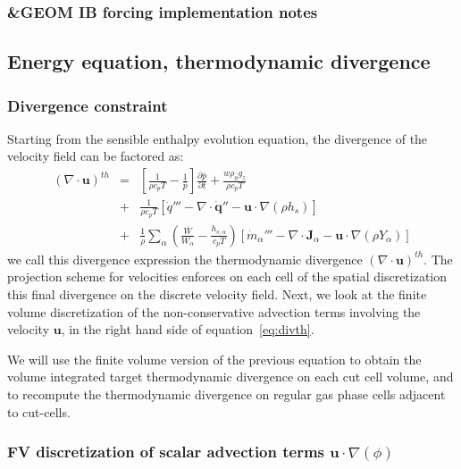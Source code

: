 \documentclass[12pt]{article}
\begin{document}
\subsubsection{\&GEOM IB forcing implementation notes}


\subsection{Energy equation, thermodynamic divergence}

\subsubsection{Divergence constraint}

Starting from the sensible enthalpy evolution equation, the divergence of the velocity field can be factored as:
%
\begin{eqnarray}
    ( \nabla \cdot \mathbf{u} )^{th} &=&
    \left[ \frac{1}{\rho c_p T} - \frac{1}{\bar{p}} \right]
    \frac{\partial \bar{p}}{\partial t} + \frac{w \rho_0 g_z}{\rho c_p T} \nonumber \\
    &+& \frac{1}{\rho c_p T} \left[ \dot{q}''' - \nabla \cdot \dot{\mathbf{q}}'' - \mathbf{u} \cdot \nabla (\rho h_s) \right] \nonumber \\
    &+& \frac{1}{\rho} \sum_\alpha \left( \frac{\overline{W}}{W_\alpha} - \frac{h_{s,\alpha}}{c_p T} \right) \left[ \dot{m}_\alpha''' - \nabla \cdot \mathbf{J}_\alpha - \mathbf{u} \cdot \nabla (\rho Y_\alpha) \right] \label{eq:divth}
\end{eqnarray}
%
we call this divergence expression the thermodynamic divergence $( \nabla \cdot \mathbf{u} )^{th}$. The projection scheme for velocities enforces on each cell of the spatial discretization this final divergence on the discrete velocity field.
Next, we look at the finite volume discretization of the non-conservative advection terms involving the velocity $\mathbf{u}$, in the right hand side of equation~\eqref{eq:divth}.

We will use the finite volume version of the previous equation to obtain the volume integrated target thermodynamic divergence on each cut cell volume, and to recompute the thermodynamic divergence on regular gas phase cells adjacent to cut-cells.


\subsubsection{FV discretization of scalar advection terms $\mathbf{u} \cdot \nabla (\phi)$}
\end{document}
